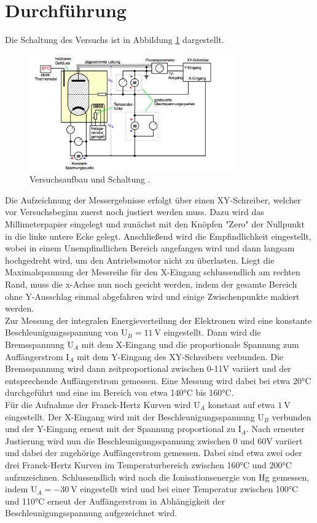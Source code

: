 \section{Durchführung}
Die Schaltung des Versuchs ist in Abbildung \ref{fig:Schaltung} dargestellt.
\begin{figure}[H]
  \centering
  \includegraphics[height=5cm]{Schaltung.png}
  \caption{Versuchsaufbau und Schaltung \cite{skript}.}
  \label{fig:Schaltung}
\end{figure}
Die Aufzeichnung der Messergebnisse erfolgt über einen XY-Schreiber, welcher vor
Versuchsbeginn zuerst noch justiert werden muss. Dazu wird das Millimeterpapier eingelegt
und zunächst mit den Knöpfen "Zero" der Nullpunkt in die linke untere Ecke gelegt.
Anschließend wird die Empfindlichkeit eingestellt, wobei in einem Unempfindlichen Bereich
angefangen wird und dann langsam hochgedreht wird, um den Antriebsmotor nicht zu überlasten.
Liegt die Maximalspannung der Messreihe für den X-Eingang schlussendlich am rechten Rand,
muss die x-Achse nun noch geeicht werden, indem der gesamte Bereich ohne Y-Ausschlag einmal
abgefahren wird und einige Zwischenpunkte makiert werden. \\
Zur Messung der integralen Energieverteilung der Elektronen wird eine konstante
Beschleunigungsspannung von $\text{U}_B = \SI{11}{\volt}$ eingestellt. Dann wird die
Bremsspannung $\text{U}_A$ mit dem X-Eingang und die proportionale Spannung zum Auffängerstrom $\text{I}_A$
mit dem Y-Eingang des XY-Schreibers verbunden. Die Bremsspannung wird dann zeitproportional
zwischen 0-11$\si{\volt}$ variiert und der entsprechende Auffängerstrom gemessen.
Eine Messung wird dabei bei etwa 20°C durchgeführt und eine im Bereich von etwa
140°C bis 160°C. \\
Für die Aufnahme der Franck-Hertz Kurven wird $\text{U}_A$ konstant auf etwa $\SI{1}{\volt}$
eingestellt. Der X-Eingang wird mit der Beschleunigungsspannung $\text{U}_B$ verbunden
und der Y-Eingang erneut mit der Spannung proportional zu $\text{I}_A$. Nach erneuter
Justierung wird nun die Beschleunigungsspannung zwischen 0 und 60$\si{\volt}$ variiert und dabei
der zugehörige Auffängerstrom gemessen. Dabei sind etwa zwei oder drei Franck-Hertz
Kurven im Temperaturbereich zwischen 160°C und 200°C aufzuzeichnen.
Schlussendlich wird noch die Ionisationsenergie von Hg gemessen, indem $\text{U}_A = - \SI{30}{\volt}$ eingestellt
wird und bei einer Temperatur zwischen 100°C und 110°C erneut der Auffängerstrom in Abhängigkeit
der Beschleunigungsspannung aufgezeichnet wird.
